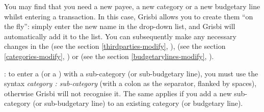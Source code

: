 You may find that you need a new payee, a new category or a new budgetary line whilst entering a transaction. In this case, Grisbi allows you to create them \enquote{on the fly}: simply enter the new name in the drop-down list, and Grisbi will automatically add it to the list. You can subsequently make any necessary changes in the  (see the section \vref{thirdparties-modify}, ),  (see the section \vref{categories-modify}, ) or  (see the section \vref{budgetarylines-modify}, ).
 
\Note{}: to enter a 
(or a ) with a sub-category (or sub-budgetary line), you must use the syntax \emph{category : sub-category} (with a colon as the separator, flanked by spaces), otherwise Grisbi will not recognise it. The same applies if you add a new sub-category (or sub-budgetary line) to an existing category (or budgetary line).

